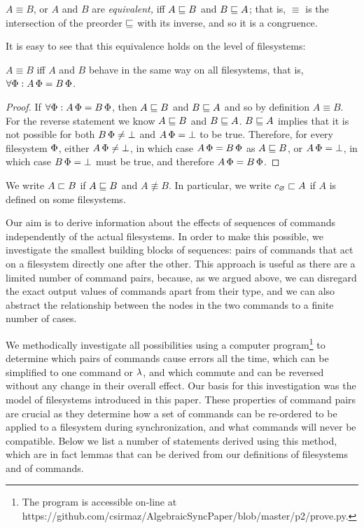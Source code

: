 \begin{mydef}[$\equiv$]
$A\equiv B$,
or $A$ and $B$ are \emph{equivalent,}
iff $A\sqsubseteq B$ and $B\sqsubseteq A$;
that is, $\equiv$ is the intersection of the preorder $\sqsubseteq$ with its inverse,
and so it is a congruence.
\end{mydef}

It is easy to see that this equivalence holds on the level of filesystems:

\begin{mylem}
$A\equiv B$
iff $A$ and $B$ behave in the same way on
all filesystems, that is, $\forall \Phi: A\,\Phi=B\,\Phi$.
\end{mylem}
\begin{proof}
If $\forall \Phi: A\,\Phi=B\,\Phi$, then $A\sqsubseteq B$ and $B\sqsubseteq A$ and so by definition $A\equiv B$.
For the reverse statement we know $A\sqsubseteq B$ and $B\sqsubseteq A$.
$B\sqsubseteq A$ implies that it is not possible for both $B\,\Phi\neq\bot$ and $A\,\Phi=\bot$ to be true.
Therefore, for every filesystem $\Phi$, either $A\,\Phi\neq\bot$, in which case $A\,\Phi=B\,\Phi$ as $A\sqsubseteq B$, or $A\,\Phi=\bot$,
in which case $B\,\Phi=\bot$ must be true, and therefore $A\,\Phi=B\,\Phi$.
\end{proof}

\begin{mydef}[$\strext$]
We write $A\sqsubset B$ if $A\sqsubseteq B$ and $A\nequiv B$.
In particular, we write $c_\varnothing\sqsubset{A}$ if $A$ is defined on some filesystems.
\end{mydef}


Our aim is to derive information about the effects of sequences
of commands independently of the actual filesystems.
In order to make this possible, we investigate the smallest building
blocks of sequences: pairs of commands that act on a filesystem directly one after the other.
This approach is useful as there are a limited number of command pairs,
because, as we argued above, we can disregard the exact output values of commands apart from their type,
and we can also abstract the relationship between the nodes in the two commands
to a finite number of cases.

We methodically investigate all possibilities using a computer 
program\footnote{The program is accessible on-line at \\
https://github.com/csirmaz/AlgebraicSyncPaper/blob/master/p2/prove.py.}
to determine
which pairs of commands cause errors all the time,
which can be simplified to one command or $\lambda$,
and which commute and can be reversed without any change in their overall effect.
Our basis for this investigation was the model of filesystems introduced in this paper.
These properties of command pairs are crucial as they determine
how a set of commands can be re-ordered to be applied to a filesystem
during synchronization, and what commands will never be compatible.
Below we list a number of statements derived using this method,
which are in fact lemmas that can be derived from our definitions of filesystems and of commands.

